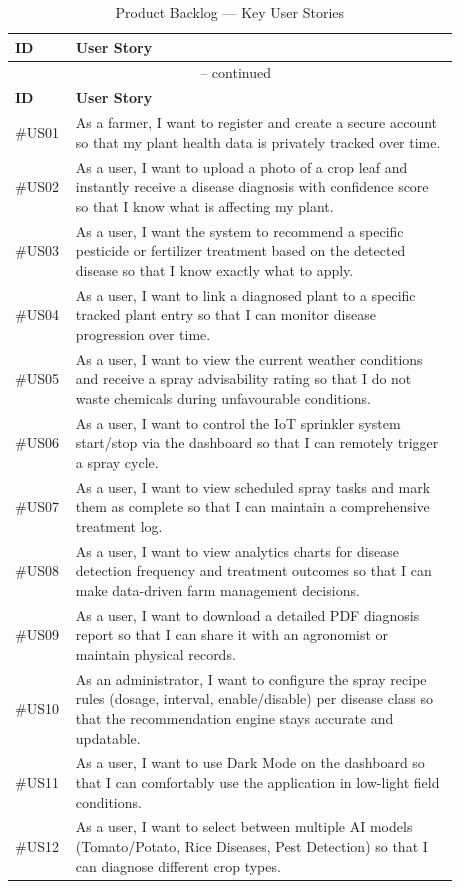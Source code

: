 \documentclass[12pt,a4paper]{report}
\begin{document}
\begin{longtable}{p{0.08\linewidth} p{0.80\linewidth}}
\caption{Product Backlog — Key User Stories} \label{tab:backlog} \\
\toprule
\textbf{ID} & \textbf{User Story} \\
\midrule
\endfirsthead
\multicolumn{2}{c}{\tablename\ \thetable{} -- continued} \\
\toprule
\textbf{ID} & \textbf{User Story} \\
\midrule
\endhead
\bottomrule
\endfoot

\#US01 & As a farmer, I want to register and create a secure account so that my plant health data is privately tracked over time. \\[4pt]
\#US02 & As a user, I want to upload a photo of a crop leaf and instantly receive a disease diagnosis with confidence score so that I know what is affecting my plant. \\[4pt]
\#US03 & As a user, I want the system to recommend a specific pesticide or fertilizer treatment based on the detected disease so that I know exactly what to apply. \\[4pt]
\#US04 & As a user, I want to link a diagnosed plant to a specific tracked plant entry so that I can monitor disease progression over time. \\[4pt]
\#US05 & As a user, I want to view the current weather conditions and receive a spray advisability rating so that I do not waste chemicals during unfavourable conditions. \\[4pt]
\#US06 & As a user, I want to control the IoT sprinkler system start/stop via the dashboard so that I can remotely trigger a spray cycle. \\[4pt]
\#US07 & As a user, I want to view scheduled spray tasks and mark them as complete so that I can maintain a comprehensive treatment log. \\[4pt]
\#US08 & As a user, I want to view analytics charts for disease detection frequency and treatment outcomes so that I can make data-driven farm management decisions. \\[4pt]
\#US09 & As a user, I want to download a detailed PDF diagnosis report so that I can share it with an agronomist or maintain physical records. \\[4pt]
\#US10 & As an administrator, I want to configure the spray recipe rules (dosage, interval, enable/disable) per disease class so that the recommendation engine stays accurate and updatable. \\[4pt]
\#US11 & As a user, I want to use Dark Mode on the dashboard so that I can comfortably use the application in low-light field conditions. \\[4pt]
\#US12 & As a user, I want to select between multiple AI models (Tomato/Potato, Rice Diseases, Pest Detection) so that I can diagnose different crop types. \\[4pt]
\end{longtable}
\end{document}
